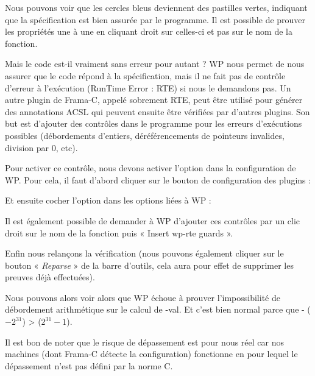 Nous pouvons voir que les cercles bleus deviennent des pastilles vertes, 
indiquant que la spécification est bien assurée par le programme. Il est 
possible de prouver les propriétés une à une en cliquant droit sur celles-ci 
et pas sur le nom de la fonction.



Mais le code est-il vraiment sans erreur pour autant ? WP nous permet de nous 
assurer que le code répond à la spécification, mais il ne fait pas de contrôle 
d'erreur à l'exécution (RunTime Error : RTE) si nous le demandons pas. Un autre
plugin de Frama-C, appelé sobrement RTE, peut être utilisé pour générer des
annotations ACSL qui peuvent ensuite être vérifiées par d'autres plugins.
Son but est
d'ajouter des contrôles dans le programme pour les erreurs d'exécutions 
possibles (débordements d'entiers, déréférencements de pointeurs invalides, 
division par 0, etc).



Pour activer ce contrôle, nous devons activer l'option dans la configuration
de WP. Pour cela, il faut d'abord cliquer sur le bouton de configuration des
plugins :




Et ensuite cocher l'option  dans les options liées à WP :




Il est également possible de demander à WP d'ajouter ces 
contrôles par un clic droit sur le nom de la fonction puis
« Insert wp-rte guards ».


Enfin nous relançons la vérification (nous pouvons également cliquer sur le 
bouton « \textit{Reparse} » de la barre d'outils, cela aura pour effet de supprimer les
preuves déjà effectuées).



Nous pouvons alors voir alors que WP échoue à prouver  l'impossibilité de 
débordement arithmétique sur le calcul de -val. Et c'est bien normal parce 
que - ($-2^{31}$) >  ($2^{31}-1$).





\begin{Information}
Il est bon de noter que le risque de dépassement est pour nous réel car nos
machines (dont Frama-C détecte la configuration) fonctionne en 
pour lequel le dépassement n'est pas défini par la norme C.
\end{Information}


